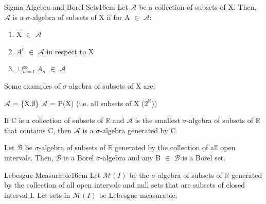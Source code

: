     \begin{definition}{Sigma Algebra and Borel Sets}{16cm}
        Let $\mathcal{A}$ be a collection of subsets of X.
        Then, $\mathcal{A}$ is a {\color{lblue} $\sigma$-algebra}
        of subsets of X if for A $\in$ $\mathcal{A}$:

        \begin{enumerate}[label=(\alph*), itemsep=1.5cm, itemsep=0.1cm]
            \item X $\in$ $\mathcal{A}$
            
            \item $A^c$ $\in$ $\mathcal{A}$ in respect to X
            
            \item $\cup_{n=1}^{\infty} A_n$ $\in$ $\mathcal{A}$
        \end{enumerate}

        Some examples of $\sigma$-algebra of subsets of X are:

        \hspace{0.5cm}
        $\mathcal{A}$ = \{X,$\emptyset$\}
        \hspace{1cm}
        $\mathcal{A}$ = P(X) (i.e. all subsets of X ($2^{\mathbb{R}}$))

        \vspace{0.3cm}

        If C is a collection of subsets of $\mathbb{R}$
        and $\mathcal{A}$ is the smallest $\sigma$-algebra of subsets
        of $\mathbb{R}$ that contains C, then $\mathcal{A}$
        is a {\color{lblue} $\sigma$-algebra generated by} C.

        Let $\mathcal{B}$ be $\sigma$-algebra of subsets of $\mathbb{R}$
        generated by the collection of all open intervals.
        Then, $\mathcal{B}$ is a {\color{lblue} Borel $\sigma$-algebra}
        and any B $\in$ $\mathcal{B}$ is a Borel set.
    \end{definition}

    \vspace{0.5cm}



    \begin{definition}{Lebesgue Measurable}{16cm}
        Let $\mathcal{M}(I)$ be the $\sigma$-algebra of subsets of $\mathbb{R}$
        generated by the collection of all open intervals and null sets
        that are subsets of closed interval I.
        Let sets in $\mathcal{M}(I)$ be {\color{lblue} Lebesgue measurable}.
    \end{definition}

